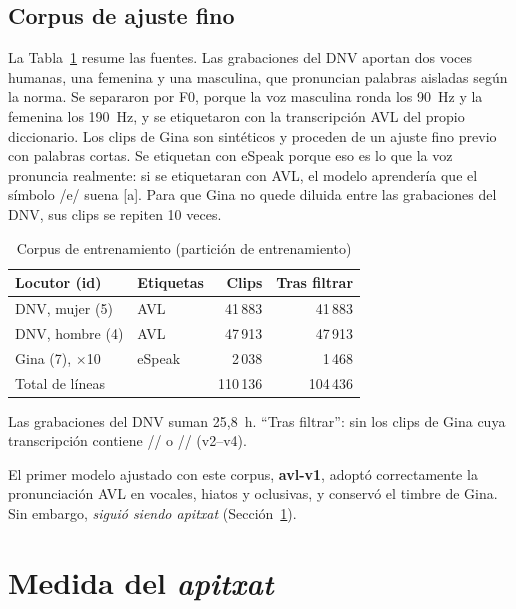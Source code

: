 \documentclass[conference]{IEEEtran}
\newcommand{\fz}{\textipa{z}}
\newcommand{\fZ}{\textipa{Z}}
\begin{document}
\subsection{Corpus de ajuste fino}
La Tabla~\ref{tab:datos} resume las fuentes. Las grabaciones del DNV aportan dos voces humanas, una femenina y una masculina, que pronuncian palabras aisladas según la norma. Se separaron por F0, porque la voz masculina ronda los 90~Hz y la femenina los 190~Hz, y se etiquetaron con la transcripción AVL del propio diccionario. Los clips de Gina son sintéticos y proceden de un ajuste fino previo con palabras cortas. Se etiquetan con eSpeak porque eso es lo que la voz pronuncia realmente: si se etiquetaran con AVL, el modelo aprendería que el símbolo /e/ suena [a]. Para que Gina no quede diluida entre las grabaciones del DNV, sus clips se repiten 10 veces.

\begin{table}[t]
\centering
\caption{Corpus de entrenamiento (partición de entrenamiento)}
\label{tab:datos}
\begin{tabular}{@{}llrr@{}}
\toprule
Locutor (id) & Etiquetas & Clips & Tras filtrar \\
\midrule
DNV, mujer (5) & AVL & 41\,883 & 41\,883 \\
DNV, hombre (4) & AVL & 47\,913 & 47\,913 \\
Gina (7), $\times$10 & eSpeak & 2\,038 & 1\,468 \\
\midrule
Total de líneas & & 110\,136 & 104\,436 \\
\bottomrule
\end{tabular}
\vspace{2pt}

{\footnotesize Las grabaciones del DNV suman 25,8~h. ``Tras filtrar'': sin los clips de Gina cuya transcripción contiene /\fz/ o /\fZ/ (v2--v4).}
\end{table}

El primer modelo ajustado con este corpus, \textbf{avl-v1}, adoptó correctamente la pronunciación AVL en vocales, hiatos y oclusivas, y conservó el timbre de Gina. Sin embargo, \emph{siguió siendo apitxat} (Sección~\ref{sec:diag}).

\section{Medida del \textit{apitxat}}\label{sec:diag}
\end{document}
